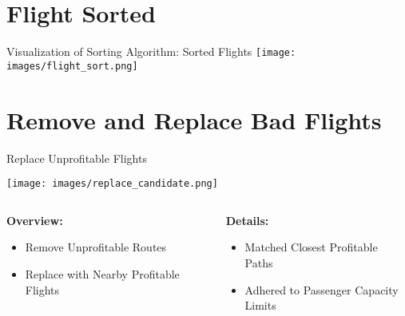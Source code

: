 \documentclass[aspectratio=169,xcolor=dvipsnames]{beamer}
\begin{document}
\section{Flight Sorted}

\begin{frame}{Visualization of Sorting Algorithm: Sorted Flights}
    \texttt{[image: images/flight\_sort.png]}
\end{frame}

\section{Remove and Replace Bad Flights}

\begin{frame}{Replace Unprofitable Flights}
    \begin{minipage}[t]{\textwidth}
        \centering
        \texttt{[image: images/replace\_candidate.png]}
    \end{minipage}
    \hfill
    \vspace{0.25cm} %
    \begin{minipage}[t]{\textwidth}
        \begin{columns}[t]
            \begin{column}{0.45\textwidth}
                \centering
                \LARGE\textbf{Overview:}
                \begin{itemize}
                    \large\item Remove Unprofitable Routes
                    \large\item Replace with Nearby Profitable Flights
                \end{itemize}
            \end{column}
            \begin{column}{0.05\textwidth} %
            \end{column}
            \begin{column}{0.5\textwidth}
                \centering
                \LARGE\textbf{Details:}
                \begin{itemize}
                    \large\item Matched Closest Profitable Paths
                    \large\item  Adhered to Passenger Capacity Limits
                \end{itemize}
            \end{column}
        \end{columns}
    \end{minipage} 
\end{frame}
\end{document}
